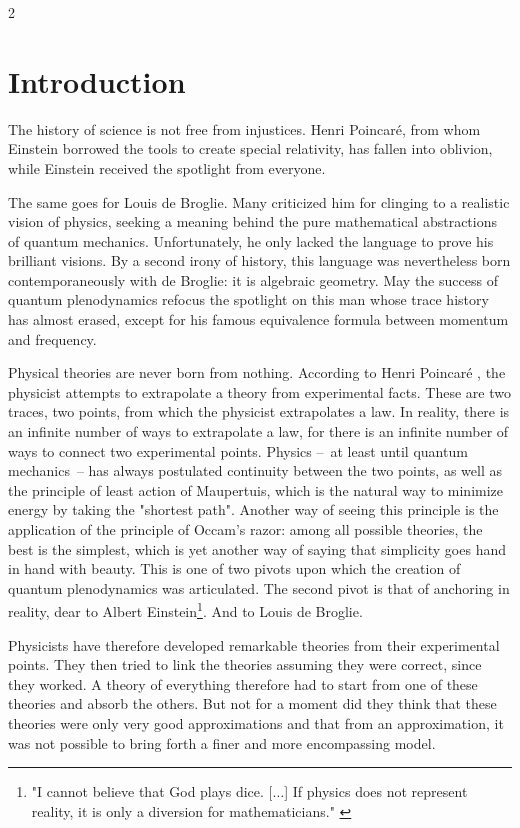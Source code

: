 \begin{multicols}{2}
	
	\section{Introduction}
	
	The history of science is not free from injustices. Henri Poincaré,
	from whom Einstein borrowed the tools to create special relativity,
	has fallen into oblivion, while Einstein received the spotlight 
	from everyone.
	
	The same goes for Louis de Broglie. Many criticized him for 
	clinging to a realistic vision of physics, seeking a
	meaning behind the pure mathematical abstractions of quantum 
	mechanics. Unfortunately, he only lacked the language to 
	prove his brilliant visions. By a second irony of history, 
	this language was nevertheless born contemporaneously with de Broglie: it is 
	algebraic geometry. May the success of quantum plenodynamics 
	refocus the spotlight on this man whose trace history has almost 
	erased, except for his famous equivalence formula 
	between momentum and frequency.
	\medskip
	
	Physical theories are never born from nothing. According to Henri 
	Poincaré \cite{poincare:1902:sh}, the physicist attempts 
	to extrapolate a theory from experimental facts. These are two 
	traces, two points, from which the physicist extrapolates a law. 
	In reality, there is an infinite number of ways to extrapolate a law, for there is an infinite number of ways to connect two experimental points. Physics --~at least until quantum mechanics~-- 
	has always postulated continuity between the two points, as well as the 
	principle of least action of Maupertuis, which is the natural way 
	to minimize energy by taking the "shortest path". Another 
	way of seeing this principle is the application of the principle of 
	Occam's razor: among all possible theories, the best 
	is the simplest, which is yet another way of saying that 
	simplicity goes hand in hand with beauty. This is one of two pivots upon 
	which the creation of quantum plenodynamics was articulated. The 
	second pivot is that of anchoring in reality, dear to Albert 
	Einstein\footnote{"I cannot believe that God plays dice. [$\dots$] If physics does not represent reality, it is only a diversion for mathematicians." \cite{EinsteinBorn2005}}. \cite{einstein1949autobiographical} And to Louis de Broglie. \cite{debroglie1976physique}
	
	Physicists have therefore developed remarkable theories from 
	their experimental points. They then tried to link the 
	theories assuming they were correct, since they 
	worked. A theory of everything therefore had to start from one of these 
	theories and absorb the others. But not for a moment did they think 
	that these theories were only very good approximations and that 
	from an approximation, it was not possible to bring forth 
	a finer and more encompassing model.
	

\end{multicols}
